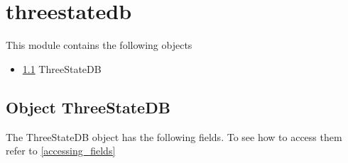 \section{threestatedb}
\label{module_threestatedb}
This module contains the following objects

\begin{itemize}
\item \ref{object_ThreeStateDB} ThreeStateDB

\end{itemize}
\subsection{Object ThreeStateDB}

\label{object_ThreeStateDB}

The ThreeStateDB object has the following fields. To see how to access them refer to \ref{accessing_fields}
